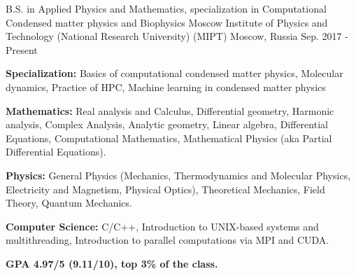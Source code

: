

\begin{cventries}

  \cventry
    {B.S. in Applied Physics and Mathematics, \newline specialization in Computational Condensed matter physics and Biophysics} %
    {Moscow Institute of Physics and Technology (National Research University) (MIPT)} %
    {Moscow, Russia} %
    {Sep. 2017 - Present} %
    {
      \begin{cvitems} %
        \item {\textbf{Specialization:} Basics of computational condensed matter physics, Molecular dynamics, Practice of HPC, Machine learning in condensed matter physics}
        \item {\textbf{Mathematics:} Real analysis and Calculus, Differential geometry, Harmonic analysis, Complex Analysis, Analytic geometry, Linear algebra, Differential Equations, Computational Mathematics, Mathematical Physics (aka Partial Differential Equations).}
        \item {\textbf{Physics:} General Physics (Mechanics, Thermodynamics and Molecular Physics, Electricity and Magnetism, Physical Optics), Theoretical Mechanics, Field Theory, Quantum Mechanics.}
        \item {\textbf{Computer Science:}  C/C++, Introduction to UNIX-based systems and multithreading, Introduction to parallel computations via MPI and CUDA. }
		\item {\textbf{GPA 4.97/5 (9.11/10), top 3\% of the class.}}        
      \end{cvitems}
    }

\end{cventries}
